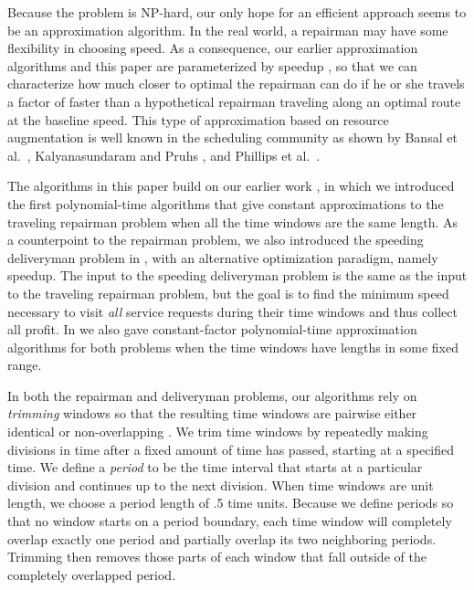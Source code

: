 \documentclass[11pt]{article}
\begin{document}
Because the problem is NP-hard, our only hope for an efficient approach seems to be an approximation algorithm.
In the real world, a repairman may have some flexibility in choosing speed.  As a consequence, our earlier approximation algorithms \cite{Frederickson5} and this paper are parameterized by speedup , so that we can characterize how much closer to optimal the repairman can do if he or she travels a factor of  faster than a hypothetical repairman traveling along an optimal route at the baseline speed.  This type of approximation based on resource augmentation is well known in the scheduling community as shown by Bansal et al.~\cite{Bansal2}, Kalyanasundaram and Pruhs \cite{Kalyanasundaram}, and Phillips et al.~\cite{Phillips}.

The algorithms in this paper build on our earlier work \cite{Frederickson3, Frederickson6}, in which we introduced the first polynomial-time algorithms that give constant approximations to the traveling repairman problem when all the time windows are the same length.  As a counterpoint to the repairman problem, we also introduced the speeding deliveryman problem in \cite{Frederickson3, Frederickson6}, with an alternative optimization paradigm, namely speedup.  The input to the speeding deliveryman problem is the same as the input to the traveling repairman problem, but the goal is to find the minimum speed necessary to visit {\em all} service requests during their time windows and thus collect all profit.  In \cite{Frederickson6} we also gave constant-factor polynomial-time approximation algorithms for both problems when the time windows have lengths in some fixed range.

In both the repairman and deliveryman problems, our algorithms \cite{Frederickson3, Frederickson6} rely on {\em trimming} windows so that the resulting time windows are pairwise either identical or non-overlapping .  We trim time windows by repeatedly making divisions in time after a fixed amount of time has passed, starting at a specified time.  We define a {\em period} to be the time interval that starts at a particular division and continues up to the next division.  When time windows are unit length, we choose a period length of .5 time units.  Because we define periods so that no window starts on a period boundary, each time window will completely overlap exactly one period and partially overlap its two neighboring periods.  Trimming then removes those parts of each window that fall outside of the completely overlapped period.
\end{document}
